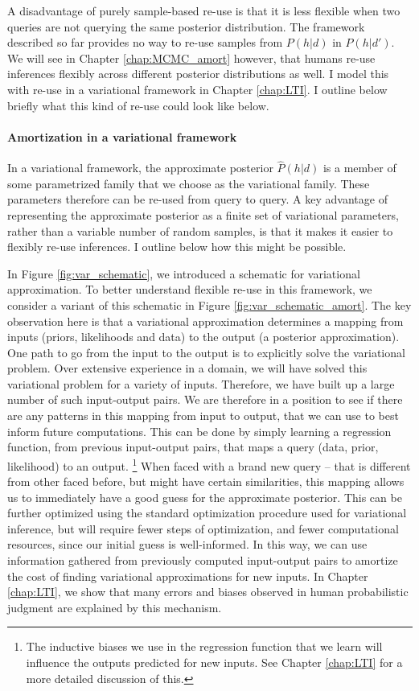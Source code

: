 A disadvantage of purely sample-based re-use is that it is less flexible when two queries are not querying the same posterior distribution. The framework described so far provides no way to re-use samples from $P(h | d)$ in $P(h | d')$. We will see in Chapter \ref{chap:MCMC_amort} however, that humans re-use inferences flexibly across different posterior distributions as well. I model this with re-use in a variational framework in Chapter \ref{chap:LTI}. I outline below briefly what this kind of re-use could look like below.

\paragraph{Amortization in a variational framework} 

In a variational framework, the approximate posterior $\hat{P}(h | d)$ is a member of some parametrized family that we choose as the variational family. These parameters therefore can be re-used from query to query. A key advantage of representing the approximate posterior as a finite set of variational parameters, rather than a variable number of random samples, is that it makes it easier to flexibly re-use inferences. I outline below how this might be possible.

In Figure \ref{fig:var_schematic}, we introduced a schematic for variational approximation. To better understand flexible re-use in this framework, we consider a variant of this schematic in Figure \ref{fig:var_schematic_amort}. The key observation here is that a variational approximation determines a mapping from inputs (priors, likelihoods and data) to the output (a posterior approximation). One path to go from the input to the output is to explicitly solve the variational problem. Over extensive experience in a domain, we will have solved this variational problem for a variety of inputs. Therefore, we have built up a large number of such input-output pairs. We are therefore in a position to see if there are any patterns in this mapping from input to output, that we can use to best inform future computations. This can be done by simply learning a regression function, from previous input-output pairs, that maps a query (data, prior, likelihood) to an output. \footnote{The inductive biases we use in the regression function that we learn will influence the outputs predicted for new inputs. See Chapter \ref{chap:LTI} for a more detailed discussion of this.} When faced with a brand new query -- that is different from other faced before, but might have certain similarities, this mapping allows us to immediately have a good guess for the approximate posterior. This can be further optimized using the standard optimization procedure used for variational inference, but will require fewer steps of optimization, and fewer computational resources, since our initial guess is well-informed. In this way, we can use information gathered from previously computed input-output pairs to amortize the cost of finding variational approximations for new inputs. In Chapter \ref{chap:LTI}, we show that many errors and biases observed in human probabilistic judgment are explained by this mechanism.

